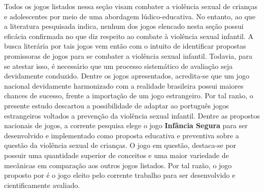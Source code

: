 Todos os jogos listados nessa seção visam combater a violência sexual de crianças e adolescentes por meio de uma abordagem lúdico-educativa. No entanto, ao que a literatura pesquisada indica, nenhum dos jogos elencado nesta seção possui eficácia confirmada no que diz respeito ao combate à violência sexual infantil. A busca literária por tais jogos vem então com o intuito de identificar propostas promissoras de jogos para se combater a violência sexual infantil. Todavia, para se atestar isso, é necessário que um processo sistemático de avaliação seja devidamente conduzido. Dentre os jogos apresentados, acredita-se que um jogo nacional devidamente harmonizado com a realidade brasileira possui maiores chances de sucesso, frente a importação de um jogo estrangeiro. Por tal razão, o presente estudo descartou a possibilidade de adaptar ao português jogos estrangeiros voltados a prevenção da violência sexual infantil. Dentre as propostos nacionais de jogos, a corrente pesquisa elege o jogo \textbf{Infância Segura} para ser desenvolvido e implementado como proposta educativa e preventiva sobre a questão da violência sexual de crianças. O jogo em questão, destaca-se por possuir uma quantidade superior de conceitos e uma maior variedade de mecânicas em comparação aos outros jogos listados. Por tal razão, o jogo proposto por  é o jogo eleito pelo corrente trabalho para ser desenvolvido e cientificamente avaliado.